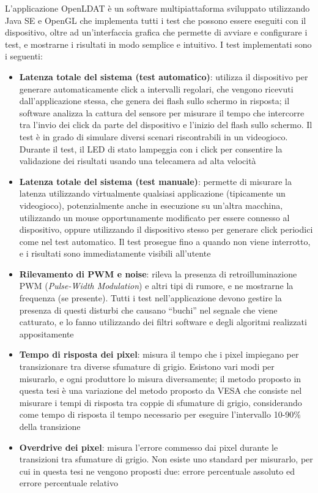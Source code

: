 \documentclass[a4paper]{article}
\begin{document}
L'applicazione OpenLDAT è un software multipiattaforma sviluppato utilizzando Java SE e OpenGL che implementa tutti i test che possono essere eseguiti con il dispositivo, oltre ad un'interfaccia grafica che permette di avviare e configurare i test, e mostrarne i risultati in modo semplice e intuitivo. I test implementati sono i seguenti:\begin{itemize}
	\item \textbf{Latenza totale del sistema (test automatico)}: utilizza il dispositivo per generare automaticamente click a intervalli regolari, che vengono ricevuti dall'applicazione stessa, che genera dei flash sullo schermo in risposta; il software analizza la cattura del sensore per misurare il tempo che intercorre tra l'invio dei click da parte del dispositivo e l'inizio del flash sullo schermo. Il test è in grado di simulare diversi scenari riscontrabili in un videogioco. Durante il test, il LED di stato lampeggia con i click per consentire la validazione dei risultati usando una telecamera ad alta velocità
	\item \textbf{Latenza totale del sistema (test manuale)}: permette di misurare la latenza utilizzando virtualmente qualsiasi applicazione (tipicamente un videogioco), potenzialmente anche in esecuzione su un'altra macchina, utilizzando un mouse opportunamente modificato per essere connesso al dispositivo, oppure utilizzando il dispositivo stesso per generare click periodici come nel test automatico. Il test prosegue fino a quando non viene interrotto, e i risultati sono immediatamente visibili all'utente
	\item \textbf{Rilevamento di PWM e noise}: rileva la presenza di retroilluminazione PWM (\textit{Pulse-Width Modulation}) e altri tipi di rumore, e ne mostrarne la frequenza (se presente). Tutti i test nell'applicazione devono gestire la presenza di questi disturbi che causano ``buchi'' nel segnale che viene catturato, e lo fanno utilizzando dei filtri software e degli algoritmi realizzati appositamente
	\item \textbf{Tempo di risposta dei pixel}: misura il tempo che i pixel impiegano per transizionare tra diverse sfumature di grigio. Esistono vari modi per misurarlo, e ogni produttore lo misura diversamente; il metodo proposto in questa tesi è una variazione del metodo proposto da VESA che consiste nel misurare i tempi di risposta tra coppie di sfumature di grigio, considerando come tempo di risposta il tempo necessario per eseguire l'intervallo 10-90\% della transizione
	\item \textbf{Overdrive dei pixel}: misura l'errore commesso dai pixel durante le transizioni tra sfumature di grigio. Non esiste uno standard per misurarlo, per cui in questa tesi ne vengono proposti due: errore percentuale assoluto ed errore percentuale relativo

\end{itemize}
\end{document}
